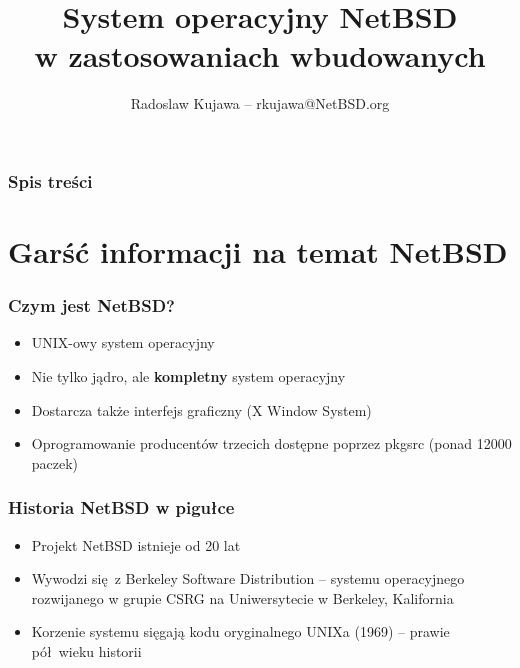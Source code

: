 \documentclass[dvipsnames,table]{beamer}
\title{System operacyjny NetBSD\\ w zastosowaniach wbudowanych}
\author{Radoslaw Kujawa -- rkujawa@NetBSD.org}
\institute{The NetBSD Foundation / OSEC}
\begin{document}
\begin{frame}
\titlepage
\end{frame}

\begin{frame}[allowframebreaks]
\frametitle{Spis treści}
{
\hypersetup{colorlinks=true,linkcolor=black,urlcolor=NetBSD-orange}
\tableofcontents
}
\end{frame}

\section{Garść informacji na temat NetBSD}

\begin{frame}
\frametitle{Czym jest NetBSD?}
\begin{itemize}
	\item UNIX-owy system operacyjny
	\item Nie tylko jądro, ale \textbf{kompletny} system operacyjny
	\item Dostarcza także interfejs graficzny (X Window System)
	\item Oprogramowanie producentów trzecich dostępne poprzez pkgsrc (ponad 12000 paczek)
\end{itemize}
\end{frame}

\begin{frame}
\frametitle{Historia NetBSD w pigułce}
\begin{itemize}
	\item Projekt NetBSD istnieje od 20 lat
	\item Wywodzi się z Berkeley Software Distribution -- systemu operacyjnego rozwijanego w grupie CSRG na Uniwersytecie w Berkeley, Kalifornia
	\item Korzenie systemu sięgają kodu oryginalnego UNIXa (1969) -- prawie pół wieku historii

\end{itemize}
\end{frame}
\end{document}
